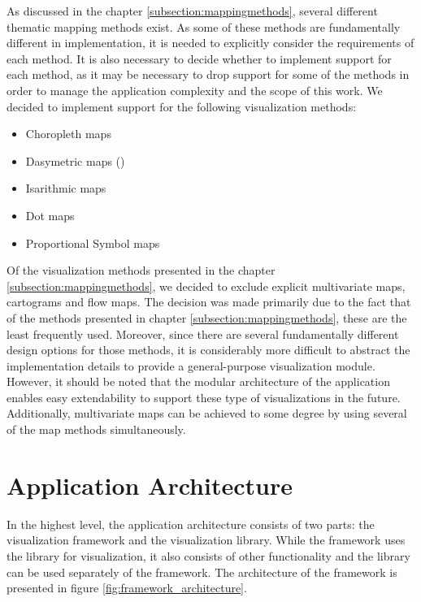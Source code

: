 As discussed in the chapter \ref{subsection:mappingmethods}, several different thematic mapping methods exist. As some of these methods are fundamentally different in implementation, it is needed to explicitly consider the requirements of each method. It is also necessary to decide whether to implement support for each method, as it may be necessary to drop support for some of the methods in order to manage the application complexity and the scope of this work. We decided to implement support for the following visualization methods:

\begin{itemize}
	\item Choropleth maps
	\item Dasymetric maps ()
	\item Isarithmic maps
	\item Dot maps
	\item Proportional Symbol maps
\end{itemize}


Of the visualization methods presented in the chapter \ref{subsection:mappingmethods}, we decided to exclude explicit multivariate maps, cartograms and flow maps. The decision was made primarily due to the fact that of the methods presented in chapter \ref{subsection:mappingmethods}, these are the least frequently used. Moreover, since there are several fundamentally different design options for those methods, it is considerably more difficult to abstract the implementation details to provide a general-purpose visualization module. However, it should be noted that the modular architecture of the application enables easy extendability to support these type of visualizations in the future. Additionally, multivariate maps can be achieved to some degree by using several of the map methods simultaneously.

\section{Application Architecture}

In the highest level, the application architecture consists of two parts: the visualization framework and the visualization library. While the framework uses the library for visualization, it also consists of other functionality and the library can be used separately of the framework. The architecture of the framework is presented in figure \ref{fig:framework_architecture}.

